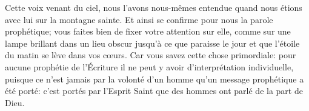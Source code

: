 Cette voix venant du ciel, nous l’avons nous-mêmes entendue
	quand nous étions avec lui sur la montagne sainte.
Et ainsi se confirme pour nous la parole prophétique;
	vous faites bien de fixer votre attention sur elle,
	comme sur une lampe brillant dans un lieu obscur
		jusqu’à ce que paraisse le jour
	et que l’étoile du matin se lève dans vos cœurs.
Car vous savez cette chose primordiale:
	pour aucune prophétie de l’Écriture
		il ne peut y avoir d’interprétation individuelle,
	puisque ce n’est jamais par la volonté d’un homme
		qu’un message prophétique a été porté:
	c’est portés par l’Esprit Saint que des hommes ont parlé de la part de Dieu.
